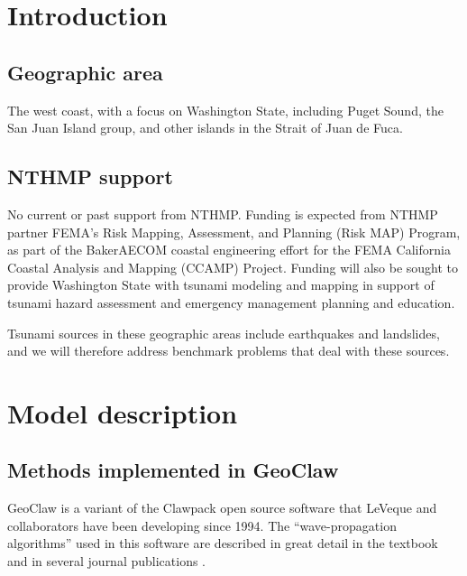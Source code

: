 
\vskip 5pt
\section{Introduction}

\subsection{Geographic area}  The west coast, with a focus on Washington State,
including Puget Sound, the San Juan Island group, and other islands in the
Strait of Juan de Fuca.



\subsection{NTHMP support}
No current or past support from NTHMP.
Funding is expected from NTHMP partner FEMA’s Risk Mapping, Assessment, and
Planning (Risk MAP) Program, as part of the BakerAECOM coastal engineering
effort for the FEMA California Coastal Analysis and Mapping (CCAMP) Project.
Funding will also be sought to provide Washington State with tsunami
modeling and mapping in support of tsunami hazard assessment and emergency
management planning and education.  

Tsunami sources in these geographic
areas include earthquakes and landslides, and we will therefore address
benchmark problems that deal with these sources.

\section{Model description}


\subsection{Methods implemented in GeoClaw}
GeoClaw is a variant of the Clawpack open source
software \cite{claw.org} that LeVeque and collaborators have
been developing since 1994.  The ``wave-propagation algorithms'' used in
this software are described in great detail in the textbook
\cite{rjl:fvmhp} and in several journal publications
\cite{rjl:advect,rjl:waveprop,jol-rjl:3d}.


